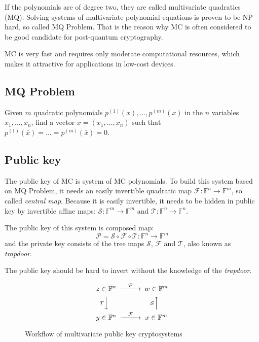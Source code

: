\documentclass[thesis=M,english]{FITthesis}[2019/12/23]
\begin{document}
If the polynomials are of degree two, they are called multivariate quadratics (MQ). Solving systems of multivariate polynomial equations is proven to be NP hard, so called MQ Problem. That is the reason why MC is often considered to be good candidate for post-quantum cryptography.

MC is very fast and requires only moderate computational resources, which makes it attractive for applications in low-cost devices.

\subsection{MQ Problem}
Given $m$ quadratic polynomials $p^{(1)}(x),\ldots,p^{(m)}(x)$ in the $n$ variables $x_1,\ldots,x_n$, find a vector $\bar{x} = (\bar{x}_1,\ldots,\bar{x}_n)$ such that $p^{(1)}(\bar{x}) = \ldots = p^{(m)}(\bar{x}) = 0$.

\subsection{Public key}
The public key of MC is system of MC polynomials. To build this system based on MQ Problem, it needs an easily invertible quadratic map $\mathcal{F}: \mathbb{F}^n \rightarrow \mathbb{F}^m$, so called \textit{central map}. Because it is easily invertible, it needs to be hidden in public key by invertible affine maps: $\mathcal{S}: \mathbb{F}^m \rightarrow \mathbb{F}^m$ and $\mathcal{T}: \mathbb{F}^n \rightarrow \mathbb{F}^n$.

The public key of this system is composed map:
\[
	\mathcal{P} = \mathcal{S} \circ \mathcal{F} \circ \mathcal{T} : \mathbb{F}^n \rightarrow \mathbb{F}^m
\]
and the private key consists of the tree maps $\mathcal{S}$, $\mathcal{F}$ and $\mathcal{T}$, also known as \textit{trapdoor}.

The public key should be hard to invert without the knowledge of the \textit{trapdoor}.

\begin{figure}[h]
\begin{equation*}
  \begin{CD}
     z \in \mathbb{F}^n @>  \mathcal{P} >> w \in \mathbb{F}^m \\
    @V\mathcal{T}VV  @A\mathcal{S}AA \\
  y \in \mathbb{F}^n @> \mathcal{F} >> x \in \mathbb{F}^m
  \end{CD}
\end{equation*}
\caption{Workflow of multivariate public key cryptosystems}
\end{figure}
\smallskip
\end{document}
